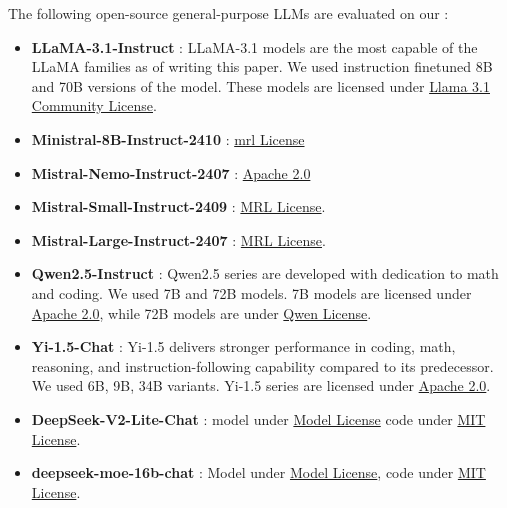 The following open-source general-purpose LLMs are evaluated on our {\benchmark}:
\begin{itemize}
    \item \textbf{LLaMA-3.1-Instruct} \citep{llama312024dubey}: LLaMA-3.1 models are the most capable of the LLaMA families as of writing this paper. We used instruction finetuned 8B and 70B versions of the model. These models are licensed under \href{https://github.com/meta-llama/llama-models/blob/main/models/llama3_1/LICENSE}{Llama 3.1 Community License}.
    \item \textbf{Ministral-8B-Instruct-2410} \citep{ministral8b}: \href{https://mistral.ai/licenses/MRL-0.1.md}{mrl License}
    \item \textbf{Mistral-Nemo-Instruct-2407} \citep{mistral_nemo_blog}: \href{https://www.apache.org/licenses/LICENSE-2.0}{Apache 2.0}
    \item \textbf{Mistral-Small-Instruct-2409} \citep{mistral_small_blog}: \href{https://mistral.ai/licenses/MRL-0.1.md}{MRL License}.
    \item \textbf{Mistral-Large-Instruct-2407} \citep{mistral_large_blog}: \href{https://mistral.ai/licenses/MRL-0.1.md}{MRL License}.
    \item \textbf{Qwen2.5-Instruct} \citep{qwen252024Yang}: Qwen2.5 series are developed with dedication to math and coding. We used 7B and 72B models. 7B models are licensed under \href{https://www.apache.org/licenses/LICENSE-2.0}{Apache 2.0}, while 72B models are under \href{https://huggingface.co/Qwen/Qwen2.5-72B-Instruct/blob/main/LICENSE}{Qwen  License}.
    \item \textbf{Yi-1.5-Chat} \citep{ai2024yi}: Yi-1.5 delivers stronger performance in coding, math, reasoning, and instruction-following capability compared to its predecessor. We used 6B, 9B, 34B variants. Yi-1.5 series are licensed under \href{https://www.apache.org/licenses/LICENSE-2.0}{Apache 2.0}.
    \item \textbf{DeepSeek-V2-Lite-Chat} \citep{deepseekv2}: model under \href{https://github.com/deepseek-ai/DeepSeek-V2/blob/main/LICENSE-MODEL}{Model License} code under \href{https://github.com/deepseek-ai/DeepSeek-V2/blob/main/LICENSE-CODE}{MIT License}.
    \item \textbf{deepseek-moe-16b-chat} \citep{dai2024deepseekmoe}: Model under \href{https://github.com/deepseek-ai/DeepSeek-MoE/blob/main/LICENSE-MODEL}{Model License}, code under \href{https://github.com/deepseek-ai/DeepSeek-MoE/blob/main/LICENSE-CODE}{MIT License}.
\end{itemize}


